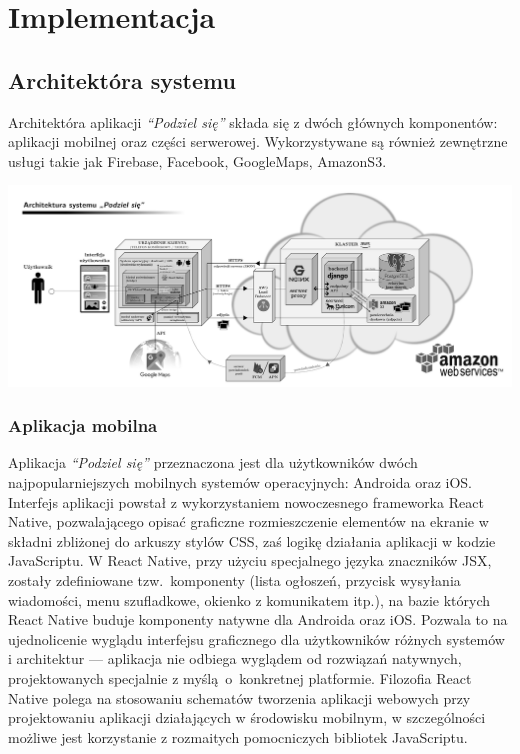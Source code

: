 \documentclass[licencjacka]{pracamgr}
\begin{document}
\chapter{Implementacja}\label{r:arch}

\section{Architektóra systemu}
Architektóra aplikacji \textit{``Podziel się''} składa się z dwóch głównych komponentów: aplikacji mobilnej oraz części serwerowej. Wykorzystywane są również zewnętrzne usługi takie jak Firebase, Facebook, GoogleMaps, AmazonS3.

\includegraphics[width=\linewidth]{architektura.png}

\subsection{Aplikacja mobilna}
Aplikacja \textit{``Podziel się''} przeznaczona jest dla użytkowników dwóch najpopularniejszych mobilnych systemów operacyjnych: Androida oraz iOS\@. Interfejs aplikacji powstał z wykorzystaniem nowoczesnego frameworka React Native, pozwalającego opisać graficzne rozmieszczenie elementów na ekranie w składni zbliżonej do arkuszy stylów CSS, zaś logikę działania aplikacji w kodzie JavaScriptu. W React Native, przy użyciu specjalnego języka znaczników JSX, zostały zdefiniowane tzw.\ komponenty (lista ogłoszeń, przycisk wysyłania wiadomości, menu szufladkowe, okienko z komunikatem itp.), na bazie których React Native buduje komponenty natywne dla Androida oraz iOS\@. Pozwala to na ujednolicenie wyglądu interfejsu graficznego dla użytkowników różnych systemów i architektur --- aplikacja nie odbiega wyglądem od rozwiązań natywnych, projektowanych specjalnie z myślą~o~konkretnej platformie. Filozofia React Native polega na stosowaniu schematów tworzenia aplikacji webowych przy projektowaniu aplikacji działających w środowisku mobilnym, w szczególności możliwe jest korzystanie z rozmaitych pomocniczych bibliotek JavaScriptu.
\end{document}
